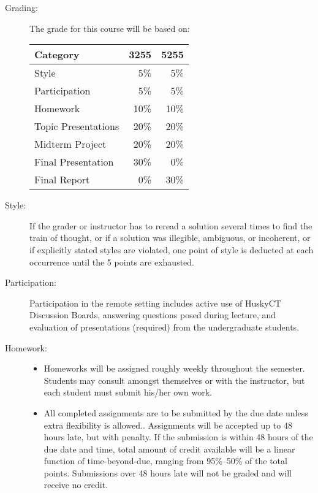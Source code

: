 \documentclass{article}
\begin{document}
\begin{multicols}{2}
\begin{description}
\item[Grading:]
The grade for this course will be based on:
\begin{center}
  \begin{tabular}{lrr}
    \toprule
    Category                & 3255   & 5255\\
    \midrule
    Style                       &  5\%   & 5\%\\
    Participation           &  5\%   & 5\%\\
    Homework              &  10\% & 10\%\\
    Topic Presentations&  20\% & 20\%\\
    Midterm Project       &  20\% & 20\%\\
    Final Presentation    &  30\% & 0\%\\
    Final Report             &  0\% & 30\%\\
    \bottomrule
  \end{tabular}
\end{center} 

\item[Style:]
  If the grader or instructor has to reread a solution several times
  to find the train of thought, or if a solution was illegible,
  ambiguous, or incoherent, or if explicitly stated styles are
  violated, one point of style is deducted at each occurrence until
  the 5 points are exhausted.

\item[Participation:]  Participation in the remote setting includes
  active use of HuskyCT Discussion Boards, answering questions posed
  during lecture, and evaluation of presentations (required) from the
  undergraduate students.

\item[Homework:]\hspace{0pt}
\begin{itemize}
\item Homeworks will be assigned roughly weekly throughout the
  semester.  Students may consult amongst themselves or with the
  instructor, but each student must submit his/her own work.
  
\item All completed assignments are to be submitted by the due date
  unless extra flexibility is allowed.. 
Assignments will be accepted up to 48 hours late, but with penalty.  If the
submission is within 48 hours of the due date and time, total amount of credit
available will be a linear function of time-beyond-due, ranging from 95\%--50\%
of the total points. Submissions over 48 hours late will not be graded and will
receive no credit.
		

\end{itemize}
\end{description}
\end{multicols}
\end{document}
